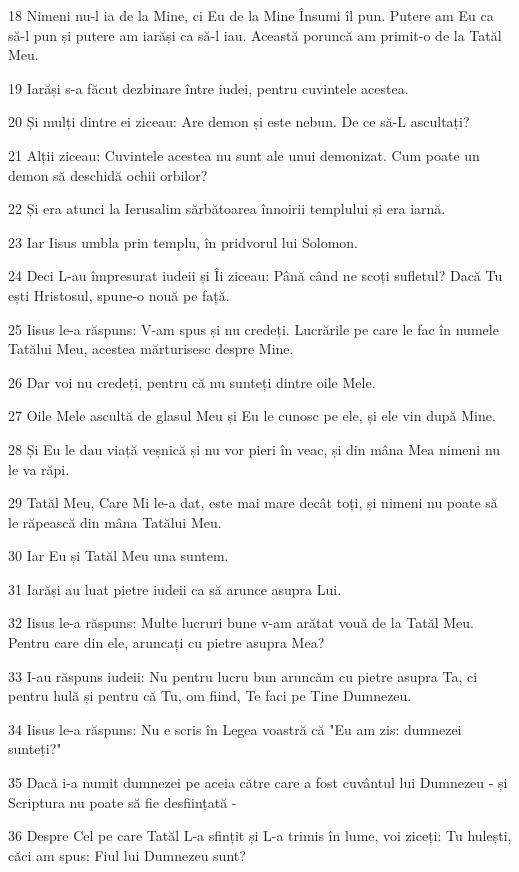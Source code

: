 \par 18 Nimeni nu-l ia de la Mine, ci Eu de la Mine Însumi îl pun. Putere am Eu ca să-l pun și putere am iarăși ca să-l iau. Această poruncă am primit-o de la Tatăl Meu.
\par 19 Iarăși s-a făcut dezbinare între iudei, pentru cuvintele acestea.
\par 20 Și mulți dintre ei ziceau: Are demon și este nebun. De ce să-L ascultați?
\par 21 Alții ziceau: Cuvintele acestea nu sunt ale unui demonizat. Cum poate un demon să deschidă ochii orbilor?
\par 22 Și era atunci la Ierusalim sărbătoarea înnoirii templului și era iarnă.
\par 23 Iar Iisus umbla prin templu, în pridvorul lui Solomon.
\par 24 Deci L-au împresurat iudeii și Îi ziceau: Până când ne scoți sufletul? Dacă Tu ești Hristosul, spune-o nouă pe față.
\par 25 Iisus le-a răspuns: V-am spus și nu credeți. Lucrările pe care le fac în numele Tatălui Meu, acestea mărturisesc despre Mine.
\par 26 Dar voi nu credeți, pentru că nu sunteți dintre oile Mele.
\par 27 Oile Mele ascultă de glasul Meu și Eu le cunosc pe ele, și ele vin după Mine.
\par 28 Și Eu le dau viață veșnică și nu vor pieri în veac, și din mâna Mea nimeni nu le va răpi.
\par 29 Tatăl Meu, Care Mi le-a dat, este mai mare decât toți, și nimeni nu poate să le răpească din mâna Tatălui Meu.
\par 30 Iar Eu și Tatăl Meu una suntem.
\par 31 Iarăși au luat pietre iudeii ca să arunce asupra Lui.
\par 32 Iisus le-a răspuns: Multe lucruri bune v-am arătat vouă de la Tatăl Meu. Pentru care din ele, aruncați cu pietre asupra Mea?
\par 33 I-au răspuns iudeii: Nu pentru lucru bun aruncăm cu pietre asupra Ta, ci pentru hulă și pentru că Tu, om fiind, Te faci pe Tine Dumnezeu.
\par 34 Iisus le-a răspuns: Nu e scris în Legea voastră că "Eu am zis: dumnezei sunteți?"
\par 35 Dacă i-a numit dumnezei pe aceia către care a fost cuvântul lui Dumnezeu - și Scriptura nu poate să fie desființată -
\par 36 Despre Cel pe care Tatăl L-a sfințit și L-a trimis în lume, voi ziceți: Tu hulești, căci am spus: Fiul lui Dumnezeu sunt?
